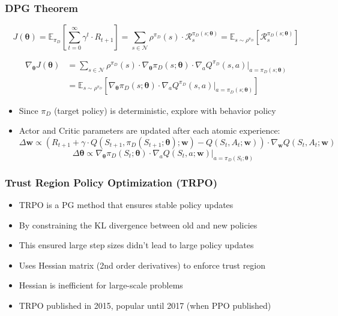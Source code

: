 \documentclass[handout]{beamer}
\begin{document}
\begin{frame}
\frametitle{DPG Theorem}
\pause
$$J(\bm{\theta}) = \mathbb{E}_{\pi_D}[\sum_{t=0}^\infty \gamma^t \cdot R_{t+1}] = \sum_{s \in \mathcal{N}} \rho^{\pi_D}(s) \cdot \mathcal{R}_s^{\pi_D(s;\bm{\theta})} = \mathbb{E}_{s \sim \rho^{\pi_D}}[\mathcal{R}_s^{\pi_D(s;\bm{\theta})}]$$
\pause
\begin{theorem}
\begin{align*}
\nabla_{\bm{\theta}} J(\bm{\theta}) & = \sum_{s \in \mathcal{N}} \rho^{\pi_D}(s) \cdot \nabla_{\bm{\theta}} \pi_D(s; \bm{\theta}) \cdot \nabla_a Q^{\pi_D}(s,a) \Bigr\rvert_{a=\pi_D(s;\bm{\theta})}\\
& = \mathbb{E}_{s \sim \rho^{\pi_D}}[\nabla_{\bm{\theta}} \pi_D(s; \bm{\theta}) \cdot \nabla_a Q^{\pi_D}(s,a) \Bigr\rvert_{a=\pi_D(s;\bm{\theta})}]
\end{align*}
\end{theorem}
\pause
\begin{itemize}[<+->]
\item Since $\pi_D$ (target policy) is deterministic, explore with behavior policy
\item Actor and Critic parameters are updated after each atomic experience:
$$\Delta \bm{w} \propto (R_{t+1} + \gamma \cdot Q(S_{t+1}, \pi_D(S_{t+1}; \bm{\theta}); \bm{w}) - Q(S_t,A_t;\bm{w})) \cdot \nabla_{\bm{w}} Q(S_t,A_t; \bm{w})$$
$$\Delta \bm{\theta} \propto \nabla_{\bm{\theta}} \pi_D(S_t; \bm{\theta}) \cdot \nabla_a Q(S_t,a;\bm{w}) \Bigr\rvert_{a=\pi_D(S_t;\bm{\theta})}$$
\end{itemize}
\end{frame}

\begin{frame}
\frametitle{Trust Region Policy Optimization (TRPO)}
\begin{itemize}
\item TRPO is a PG method that ensures stable policy updates
\item By constraining the KL divergence between old and new policies
\item This ensured large step sizes didn't lead to large policy updates
\item Uses Hessian matrix (2nd order derivatives) to enforce trust region
\item Hessian is inefficient for large-scale problems
\item TRPO published in 2015, popular until 2017 (when PPO published)
\end{itemize}
\end{frame}
\end{document}
